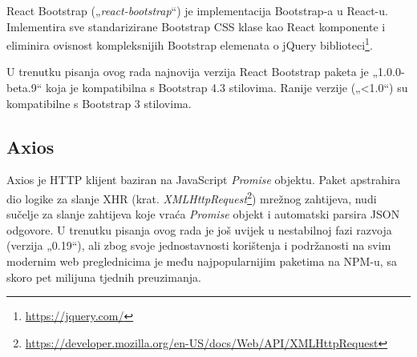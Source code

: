 \documentclass[times, utf8, diplomski, numeric]{fer}
\newcommand{\razmaks}{\vspace{10pt}}
\begin{document}
React Bootstrap („\emph{react-bootstrap}“) je implementacija Bootstrap-a u React-u.
Imlementira sve standarizirane Bootstrap CSS klase kao React komponente i eliminira ovisnost kompleksnijih Bootstrap elemenata o jQuery biblioteci\footnote{\url{https://jquery.com/}}.

U trenutku pisanja ovog rada najnovija verzija React Bootstrap paketa je „1.0.0-beta.9“ koja je kompatibilna s Bootstrap 4.3 stilovima.
Ranije verzije („<1.0“) su kompatibilne s Bootstrap 3 stilovima\citep{bs_react}.


\razmaks
\subsection{Axios}

Axios je HTTP klijent baziran na JavaScript \emph{Promise} objektu.
Paket apstrahira dio logike za slanje XHR (krat. \emph{XMLHttpRequest}\footnote{\url{https://developer.mozilla.org/en-US/docs/Web/API/XMLHttpRequest}}) mrežnog zahtijeva, nudi sučelje za slanje zahtijeva koje vraća \emph{Promise} objekt i automatski parsira JSON odgovore.
U trenutku pisanja ovog rada je još uvijek u nestabilnoj fazi razvoja (verzija „0.19“), ali zbog svoje jednostavnosti korištenja i podržanosti na svim modernim web preglednicima je među najpopularnijim paketima na NPM-u, sa skoro pet milijuna tjednih preuzimanja\citep{axios}.











\end{document}
